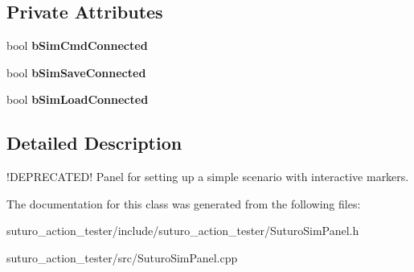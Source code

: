 \subsection*{Private Attributes}
\begin{DoxyCompactItemize}
\item 
\hypertarget{classSuturoSim_1_1SuturoSimPanel_a647938b22499afc53f92f3f1aeeb6d7c}{bool {\bfseries b\-Sim\-Cmd\-Connected}}\label{classSuturoSim_1_1SuturoSimPanel_a647938b22499afc53f92f3f1aeeb6d7c}

\item 
\hypertarget{classSuturoSim_1_1SuturoSimPanel_acf053b45869d3002a00ffa05e8996fbf}{bool {\bfseries b\-Sim\-Save\-Connected}}\label{classSuturoSim_1_1SuturoSimPanel_acf053b45869d3002a00ffa05e8996fbf}

\item 
\hypertarget{classSuturoSim_1_1SuturoSimPanel_a4a596323456c86139192c4697194fb18}{bool {\bfseries b\-Sim\-Load\-Connected}}\label{classSuturoSim_1_1SuturoSimPanel_a4a596323456c86139192c4697194fb18}

\end{DoxyCompactItemize}


\subsection{Detailed Description}
!\-D\-E\-P\-R\-E\-C\-A\-T\-E\-D! Panel for setting up a simple scenario with interactive markers. 

The documentation for this class was generated from the following files\-:\begin{DoxyCompactItemize}
\item 
suturo\-\_\-action\-\_\-tester/include/suturo\-\_\-action\-\_\-tester/Suturo\-Sim\-Panel.\-h\item 
suturo\-\_\-action\-\_\-tester/src/Suturo\-Sim\-Panel.\-cpp\end{DoxyCompactItemize}
